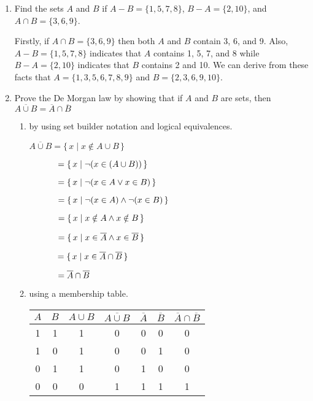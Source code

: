 \documentclass[11pt]{article}
\begin{document}
\begin{enumerate}[label=\textbf{\arabic*.}]
	\item Find the sets $A$ and $B$ if $A - B = \{1, 5, 7, 8\}$, $B - A = \{2, 10\}$, and $A \cap B = \{3, 6, 9\}$.
	
	Firstly, if $A \cap B = \{3, 6, 9\}$ then both $A$ and $B$ contain 3, 6, and 9. Also, $A - B = \{1, 5, 7, 8\}$ indicates that $A$ contains 1, 5, 7, and 8 while $B - A = \{2, 10\}$ indicates that $B$ contains 2 and 10. We can derive from these facts that $A = \{1, 3, 5, 6, 7, 8, 9\}$ and $B = \{2, 3, 6, 9, 10\}$.
	
	\item Prove the De Morgan law by showing that if $A$ and $B$ are sets, then $\overline{A \cup B} = \overline{A} \cap \overline{B}$
	
	\begin{enumerate}[label=\textbf{\alph*)}]
		\item by using set builder notation and logical equivalences.
		
		$\overline{A \cup B} = \{\,x \mid x \notin A \cup B\,\}$
		
		$\hspace{1.15cm} = \{\,x \mid \neg(x \in (A \cup B))\,\}$
		
		$\hspace{1.15cm} = \{\,x \mid \neg(x \in A \lor x \in B)\,\}$
		
		$\hspace{1.15cm} = \{\,x \mid \neg(x \in A) \land \neg(x \in B)\,\}$
		
		$\hspace{1.15cm} = \{\,x \mid x \notin A \land x \notin B\,\}$
		
		$\hspace{1.15cm} = \{\,x \mid x \in \overline{A} \land x \in \overline{B}\,\}$
		
		$\hspace{1.15cm} = \{\,x \mid x \in \overline{A} \cap \overline{B}\,\}$
		
		$\hspace{1.15cm} = \overline{A} \cap \overline{B}$
		
		\item using a membership table.
		
		\begin{tabular}{c | c | c | c | c | c | c}
			$A$ & $B$ & $A \cup B$ & $\overline{A \cup B}$ & $\overline{A}$ & $\overline{B}$ & $\overline{A} \cap \overline{B}$ \\
			\hline
			1 & 1 & 1 & 0 & 0 & 0 & 0 \\
			1 & 0 & 1 & 0 & 0 & 1 & 0 \\
			0 & 1 & 1 & 0 & 1 & 0 & 0 \\
			0 & 0 & 0 & 1 & 1 & 1 & 1
		\end{tabular}
	\end{enumerate}
\end{enumerate}
\end{document}
